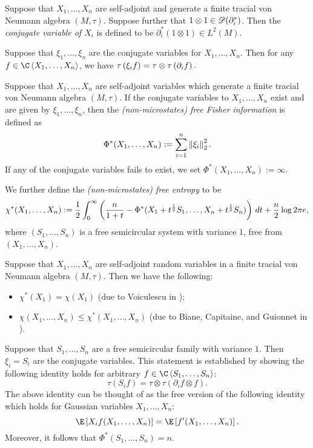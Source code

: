\begin{definition}
	Suppose that $X_1, \ldots, X_n$ are self-adjoint and generate a finite tracial von Neumann algebra $(M, \tau)$.
	Suppose further that $1\otimes1 \in \mathscr{D}(\partial_i^*)$.
	Then the \emph{conjugate variable of $X_i$} is defined to be $\partial_i^*(1\otimes1) \in L^2(M)$.
	\label{defn:conjugatevariable}
\end{definition}

Suppose that $\xi_1, \ldots, \xi_n$ are the conjugate variables for $X_1, \ldots, X_n$.
Then for any $f \in \C\ang{X_1, \ldots, X_n}$, we have $\tau\left(\xi_i f\right) = \tau\otimes\tau\left(\partial_i f\right).$

\begin{definition}
	Suppose that $X_1, \ldots, X_n$ are self-adjoint variables which generate a finite tracial von Neumann algebra $(M, \tau)$.
	If the conjugate variables to $X_1, \ldots, X_n$ exist and are given by $\xi_1, \ldots, \xi_n$, then the \emph{(non-microstates) free Fisher information} is defined as
	$$\Phi^*(X_1, \ldots, X_n) := \sum_{i=1}^n \left\|\xi_i\right\|_2^2.$$
	If any of the conjugate variables fails to exist, we set $\Phi^*(X_1, \ldots, X_n) := \infty$.

	We further define the \emph{(non-microstates) free entropy} to be
	$$\chi^*(X_1, \ldots, X_n) := \frac12\int_0^\infty \left(\frac{n}{1+t} - \Phi^*(X_1+t^{\frac12}S_1, \ldots, X_n+t^{\frac12}S_n)\right)\,dt + \frac{n}{2} \log 2\pi e,$$
	where $(S_1, \ldots, S_n)$ is a free semicircular system with variance $1$, free from $(X_1, \ldots, X_n)$.
\end{definition}

\begin{theorem}
	Suppose that $X_1, \ldots, X_n$ are self-adjoint random variables in a finite tracial von Neumann algebra $(M, \tau)$.
	Then we have the following:
	\begin{itemize}
		\item $\chi^*(X_1) = \chi(X_1)$ (due to Voiculescu in \cite{voiculescu1998fisherinfov});
		\item $\chi(X_1, \ldots, X_n) \leq \chi^*(X_1, \ldots, X_n)$ (due to Biane, Capitaine, and Guionnet in \cite{biane2003large}).
	\end{itemize}
\end{theorem}

\begin{example}
	Suppose that $S_1, \ldots, S_n$ are a free semicircular family with variance $1$.
	Then $\xi_i = S_i$ are the conjugate variables.
	This statement is established by showing the following identity holds for arbitrary $f \in \C\ang{S_1, \ldots, S_n}$:
	$$\tau(S_if) = \tau\otimes\tau(\partial_if\otimes f).$$
	The above identity can be thought of as the free version of the following identity which holds for Gaussian variables $X_1, \ldots, X_n$:
	$$\E\sq{X_if(X_1, \ldots, X_n)} = \E\sq{f'(X_1, \ldots, X_n)}.$$
	Moreover, it follows that $\Phi^*(S_1, \ldots, S_n) = n$.
\end{example}


